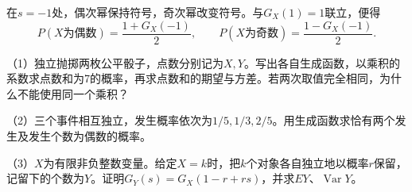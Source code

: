 在\(s=-1\)处，偶次幂保持符号，奇次幂改变符号。与\(G_X(1)=1\)联立，便得
\[
 P(X\text{为偶数})=\frac{1+G_X(-1)}2,\qquad
 P(X\text{为奇数})=\frac{1-G_X(-1)}2.
\]
\begin{exercise}
\mbox{}\par\nobreak

（1）独立抛掷两枚公平骰子，点数分别记为\(X,Y\)。写出各自生成函数，以乘积的系数求点数和为7的概率，再求点数和的期望与方差。若两次取值完全相同，为什么不能使用同一个乘积？

（2）三个事件相互独立，发生概率依次为\(1/5,1/3,2/5\)。用生成函数求恰有两个发生及发生个数为偶数的概率。

（3）\(X\)为有限非负整数变量。给定\(X=k\)时，把\(k\)个对象各自独立地以概率\(r\)保留，记留下的个数为\(Y\)。证明\(G_Y(s)=G_X(1-r+rs)\)，并求\(EY\)、\(\operatorname{Var}Y\)。
\end{exercise}
